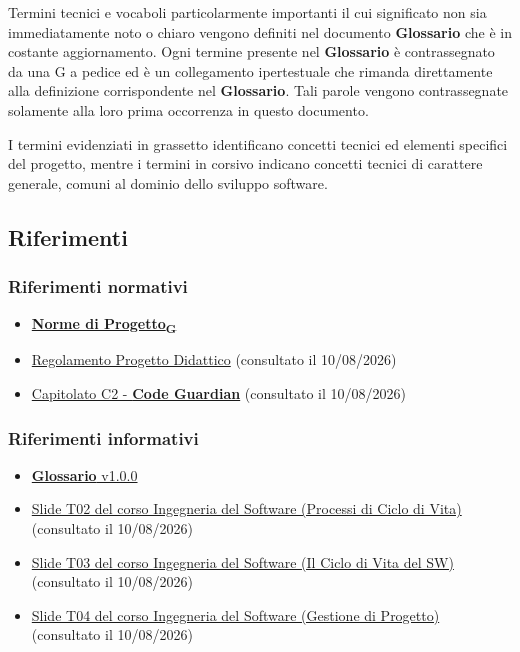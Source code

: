 \documentclass[12pt, a4paper]{article}
\newcommand{\urlglossario}{https://skynetunigroup.github.io/Code_Guardian/Documentazione/RTB/glossario_v1.0.0.pdf} %
\newcommand{\glo}[2]{\href{\urlglossario\#nameddest=#2}{#1\textsubscript{G}}}
\begin{document}
Termini tecnici e vocaboli particolarmente importanti il cui
significato non sia immediatamente noto o chiaro vengono definiti nel
documento \textbf{Glossario} che è in costante aggiornamento.
Ogni termine
presente nel \textbf{Glossario} è contrassegnato da una G a pedice ed è un
collegamento ipertestuale che rimanda direttamente alla definizione
corrispondente nel \textbf{Glossario}.
Tali parole vengono contrassegnate
solamente alla loro prima occorrenza in questo documento.

I termini evidenziati in grassetto identificano concetti tecnici ed elementi specifici del progetto, mentre i termini in corsivo indicano concetti tecnici di carattere generale, comuni al dominio dello sviluppo software.

\subsection{Riferimenti}

\subsubsection{Riferimenti normativi}

\begin{itemize}
\item
  \textbf{\glo{Norme di Progetto}{norme-di-progetto}}
\item  
  \href{https://www.math.unipd.it/~tullio/IS-1/2025/Dispense/PD1.pdf}{Regolamento Progetto Didattico} (consultato il 10/08/2026)
\item
  \href{https://www.math.unipd.it/~tullio/IS-1/2025/Progetto/C2.pdf}{Capitolato C2 - \textbf{Code Guardian}} (consultato il 10/08/2026)
\end{itemize}

\subsubsection{Riferimenti informativi}

\begin{itemize}
\item
  \href{https://skynetunigroup.github.io/Code_Guardian/Documentazione/RTB/glossario_v1.0.0.pdf}{\textbf{Glossario} v1.0.0}
\item
  \href{https://www.math.unipd.it/~tullio/IS-1/2025/Dispense/T02.pdf}{Slide T02 del corso Ingegneria del Software (Processi di Ciclo di Vita)} (consultato il 10/08/2026)
\item
    \href{https://www.math.unipd.it/~tullio/IS-1/2025/Dispense/T03.pdf}{Slide T03 del corso Ingegneria del Software (Il Ciclo di Vita del SW)} (consultato il 10/08/2026)
\item
  \href{https://www.math.unipd.it/~tullio/IS-1/2025/Dispense/T04.pdf}{Slide T04 del corso Ingegneria del Software (Gestione di Progetto)} (consultato il 10/08/2026)

\end{itemize}
\end{document}

